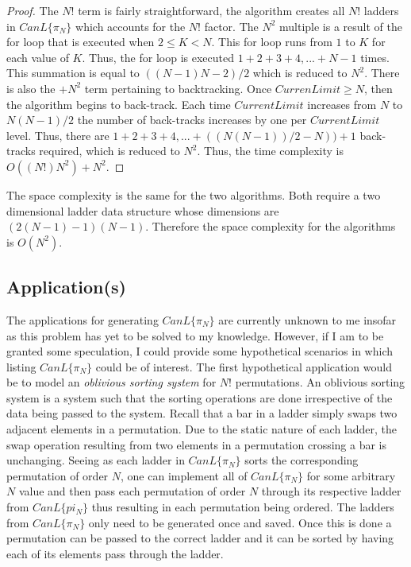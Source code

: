     \begin{proof}
        The $N!$ term is fairly straightforward, the algorithm creates all $N!$ ladders in $CanL\{\pi_{N}\}$ which accounts 
        for the $N!$ factor. The $N^{2}$ multiple is a result of the for loop that is executed when $2 \leq K < N$. This for loop runs 
        from $1$ to $K$ for each value of $K$. Thus, the for loop is executed $1 + 2 + 3 + 4, ... + N-1$ times. This summation 
        is equal to $((N-1)N-2)/2$ which is reduced to $N^{2}$. There is also the $+N^{2}$ term pertaining to backtracking. Once $CurrenLimit \geq N$, then the algorithm 
        begins to back-track. Each time $CurrentLimit$ increases from $N$ to $N(N-1)/2$ the number of back-tracks increases by one per $CurrentLimit$ level.
       Thus, there are $1 + 2 + 3 + 4, ... +  ((N(N-1))/2 - N)) + 1$ back-tracks required, which is reduced to $N^{2}$. Thus, the time 
       complexity is $O((N!)N^{2}) + N^{2}$.
    \end{proof}

    The space complexity is the same for the two algorithms. Both require a two dimensional ladder data structure whose dimensions 
    are $(2(N-1)-1)(N-1)$. Therefore the space complexity for the algorithms is $O(N^{2})$.

    \subsection{Application(s)}
    The applications for generating $CanL\{\pi_{N}\}$ are currently unknown to me insofar as this problem has yet to be solved to my knowledge. 
    However, if I am to be granted some speculation, I could provide some hypothetical scenarios in which listing $CanL\{\pi_{N}\}$ could 
    be of interest. The first hypothetical application would be to model an \emph{oblivious sorting system} for $N!$ permutations. An oblivious 
    sorting system is a system such that the sorting operations are done irrespective of the data being passed to the system.\cite{A7} Recall 
    that a bar in a ladder simply swaps two adjacent elements in a permutation. Due to the static nature of each ladder, the swap operation 
    resulting from two elements in a permutation crossing a bar is unchanging. 
    Seeing as each ladder in $CanL\{\pi_{N}\}$ sorts the corresponding permutation of order $N$, one can implement all of $CanL\{\pi_{N}\}$ 
    for some arbitrary $N$ value and then pass each permutation of order $N$ through its respective ladder from $CanL\{pi_{N}\}$ thus 
    resulting in each permutation being ordered. The ladders from $CanL\{\pi_{N}\}$ only need to be generated once and saved. Once this is done 
    a permutation can be passed to the correct ladder and it can be sorted by having each of its elements pass through the ladder. 